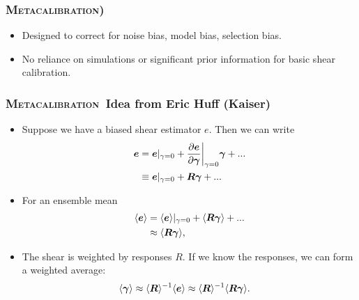 \documentclass{beamer}
\newcommand{\Mcal}{\textsc{Metacalibration}}
\newcommand{\mcalR}{\mbox{\boldmath $R$}}
\newcommand{\vecg}{\mbox{\boldmath $\gamma$}}
\newcommand{\vest}{\mbox{\boldmath $e$}}
\begin{document}
\frame
{
    \frametitle{\Mcal)}

 
 \begin{itemize}
     \item Designed to correct for noise bias, model bias, selection bias.
     \item No reliance on simulations or significant prior information
         for basic shear calibration.
 \end{itemize}

}

\frame
{
    \frametitle{\Mcal\ Idea from Eric Huff (Kaiser)}

 
    \begin{itemize}

        \item Suppose we have a biased shear estimator {\color{gold} \vest}.  Then we can write
            {\color{gold}
\begin{align} \label{eq:Eexpand}
    \vest &= \vest|_{\gamma=0} + \frac{ \partial \vest }{ \partial \vecg}\bigg|_{\gamma=0} \vecg  + ... \nonumber \\
          &\equiv \vest|_{\gamma=0} + \mbox{\mcalR}\vecg  + ...
\end{align}
            } 

        \item For an ensemble mean
            {\color{gold}
                \begin{align}
                    \langle \vest \rangle &= \langle \vest \rangle |_{\gamma=0} + \langle \mbox{\mcalR} \vecg \rangle + ... \nonumber \\
                                          &\approx \langle \mbox{\mcalR} \vecg \rangle,
                \end{align}
                }

            \item The shear is weighted by responses {\color{cadetblue} \mcalR}.  If we know the
                responses, we can form a weighted average:
            {\color{gold}
\begin{align} \label{eq:rcorr}
    \langle \vecg \rangle &\approx \langle \mbox{\mcalR} \rangle^{-1}  \langle \vest \rangle \approx \langle \mbox{\mcalR} \rangle^{-1} \langle \mcalR \vecg \rangle.
\end{align}
            }
    \end{itemize}
}
\end{document}
